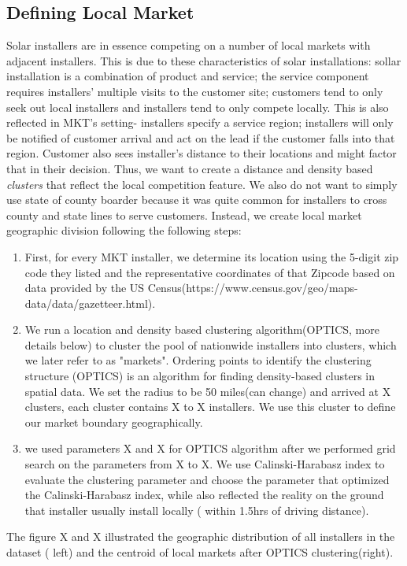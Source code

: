 \documentclass[msom,blindrev]{informs3}
\begin{document}
\subsection{Defining Local Market} 
Solar installers are in essence competing on a number of local markets with adjacent installers.  This is due to these characteristics of solar installations: sollar installation is a combination of product and service; the service component requires installers' multiple visits to the customer site;  customers tend to only seek out local installers and installers tend to only compete locally. This is also reflected in MKT's setting- installers specify a service region; installers will only be notified of customer arrival and act on the lead if the customer falls into that region. Customer also sees installer's distance to their locations and might factor that in their decision. Thus, we want to create a distance and density based \textit{clusters} that reflect the local competition feature. 
We also do not want to simply use state of county boarder because it was quite common for installers to cross county and state lines to serve customers. Instead, we create local market geographic division following the following steps: 
\begin{enumerate}
	\item First, for every MKT installer, we determine its location using the 5-digit zip code they listed and the representative coordinates of that Zipcode based on data provided by the US Census(https://www.census.gov/geo/maps-data/data/gazetteer.html). 
	\item  We run a location and density based clustering algorithm(OPTICS, more details below) to cluster the pool of nationwide installers into clusters, which we later refer to as "markets".  Ordering points to identify the clustering structure (OPTICS) is an algorithm for finding density-based clusters in spatial data.  We set the radius to be 50 miles(can change) and arrived at X clusters, each cluster contains X to X installers. We use this cluster to define our market boundary geographically.   
	\item we used parameters X and X for OPTICS algorithm after we performed grid search on the parameters from X to X. We use Calinski-Harabasz index to evaluate the clustering parameter and choose the parameter that optimized the Calinski-Harabasz index, while also reflected the reality on the ground that installer usually install locally ( within 1.5hrs of driving distance).
\end{enumerate}
The figure X and X illustrated the geographic distribution of all installers in the dataset ( left) and the centroid of local markets after OPTICS clustering(right). 
\end{document}
